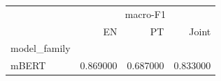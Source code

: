 \begin{tabular}{lrrr}
\toprule
 & \multicolumn{3}{c}{macro-F1} \\
 & EN & PT & Joint \\
model\_family &  &  &  \\
\midrule
mBERT & 0.869000 & 0.687000 & 0.833000 \\
\bottomrule
\end{tabular}
